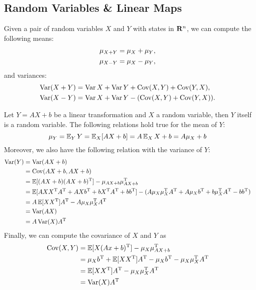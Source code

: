 \subsection{Random Variables \& Linear Maps}

\begin{lemma}
\label{lem:sums-differences-random-variables}
Given a pair of random variables \(X\) and \(Y\) with states in \(\mathbf{R}^n\), we can
compute the following means:
\begin{align*}
  \mu_{X + Y} &= \mu_X + \mu_Y, \\
  \mu_{X - Y} &= \mu_X - \mu_Y,
\end{align*}
and variances:
\begin{align*}
  \operatorname{Var}(X + Y) &= \operatorname{Var} X + \operatorname{Var} Y + \operatorname{Cov}(X, Y) + \operatorname{Cov}(Y, X), \\
  \operatorname{Var}(X - Y) &= \operatorname{Var} X + \operatorname{Var} Y - (\operatorname{Cov}(X, Y) + \operatorname{Cov}(Y, X)). \\
\end{align*}
\end{lemma}

Let \(Y = A X + b\) be a linear transformation and \(X\) a random variable, then
\(Y\) itself is a random variable. The following relations hold true for the
mean of \(Y\):
\[
\mu_Y = \operatorname{\mathbb{E}}_Y Y = \operatorname{\mathbb{E}}_X[A X + b] = A \operatorname{\mathbb{E}}_X X + b = A \mu_X + b
\]
Moreover, we also have the following relation with the variance of \(Y\):
\begin{align*}
  \operatorname{Var}(Y)
  &= \operatorname{Var}(A X + b) \\
  &= \operatorname{Cov}(A X + b, A X + b) \\
  &= \operatorname{\mathbb{E}}[(A X + b)(A X + b)^{\operatorname{T}}] - \mu_{A X + b} \mu_{A X +
    b}^{\operatorname{T}} \\
  &= \operatorname{\mathbb{E}}[
    A X X^{\operatorname{T}} A^{\operatorname{T}} + A X b^{\operatorname{T}} + b X^{\operatorname{T}} A^{\operatorname{T}}
    + b b^{\operatorname{T}}
    ]
    - (A \mu_X \mu_X^{\operatorname{T}} A^{\operatorname{T}} + A \mu_X b^{\operatorname{T}}
    + b \mu_X^{\operatorname{T}} A^{\operatorname{T}} - b b^{\operatorname{T}}) \\
  &= A \operatorname{\mathbb{E}}[X X^{\operatorname{T}}] A^{\operatorname{T}} - A \mu_X \mu_X^{\operatorname{T}}
    A^{\operatorname{T}} \\
  &= \operatorname{Var}(A X) \\
  &= A \operatorname{Var}(X) A^{\operatorname{T}}
\end{align*}
Finally, we can compute the covariance of \(X\) and \(Y\) as
\begin{align*}
  \operatorname{Cov}(X, Y)
  &= \operatorname{\mathbb{E}}[X (A x + b)^{\operatorname{T}}] - \mu_X \mu_{A X + b}^{\operatorname{T}} \\
  &= \mu_X b^{\operatorname{T}} + \operatorname{\mathbb{E}}[X X^{\operatorname{T}}] A^{\operatorname{T}}
    - \mu_X b^{\operatorname{T}} - \mu_X \mu_X^{\operatorname{T}} A^{\operatorname{T}} \\
  &= \operatorname{\mathbb{E}}[X X^{\operatorname{T}}] A^{\operatorname{T}} - \mu_X \mu_X^{\operatorname{T}} A^{\operatorname{T}} \\
  &= \operatorname{Var}(X) A^{\operatorname{T}}
\end{align*}

